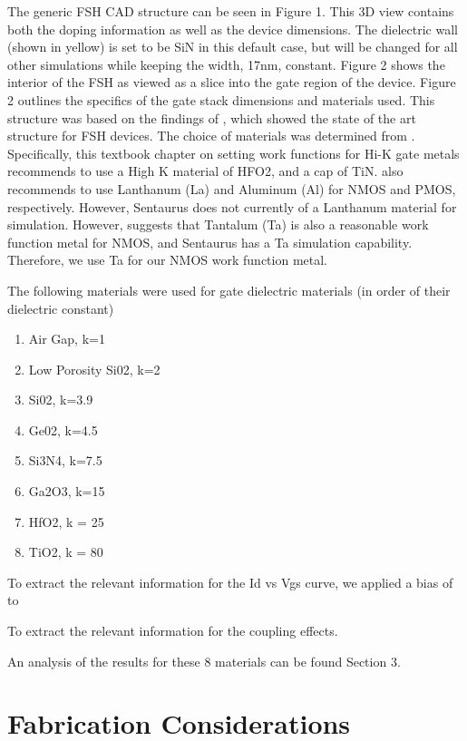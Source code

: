 \documentclass[letterpaper, 12 pt, conference]{ieeeconf}  %
\begin{document}
The generic FSH CAD structure can be seen in Figure 1. This 3D view contains both the doping information as well as the device dimensions. The dielectric wall (shown in yellow) is set to be SiN in this default case, but will be changed for all other simulations while keeping the width, 17nm, constant. Figure 2 shows the interior of the FSH as viewed as a slice into the gate region of the device. Figure 2 outlines the specifics of the gate stack dimensions and materials used. This structure was based on the findings of \cite{c1}, which showed the state of the art structure for FSH devices. The choice of materials was determined from \cite{c2}. Specifically, this textbook chapter on setting work functions for Hi-K gate metals recommends to use a High K material of HFO2, and a cap of TiN. \cite{c2} also recommends to use Lanthanum (La) and Aluminum (Al) for NMOS and PMOS, respectively. However, Sentaurus does not currently of a Lanthanum material for simulation. However, \cite{c3} suggests that Tantalum (Ta) is also a reasonable work function metal for NMOS, and Sentaurus has a Ta simulation capability. Therefore, we use Ta for our NMOS work function metal. 

The following materials were used for gate dielectric materials (in order of their dielectric constant)

\begin{enumerate}
    \item Air Gap, k=1
    \item Low Porosity Si02, k=2
    \item Si02, k=3.9
    \item Ge02, k=4.5
    \item Si3N4, k=7.5
    \item Ga2O3, k=15
    \item HfO2, k = 25
    \item TiO2, k = 80
\end{enumerate}

To extract the relevant information for the Id vs Vgs curve, we applied a bias of  to

To extract the relevant information for the coupling effects.

An analysis of the results for these 8 materials can be found Section 3.
 



\section{Fabrication Considerations}
\end{document}
